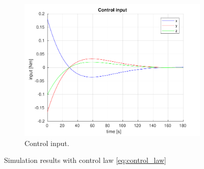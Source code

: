 \begin{figure}[ht]
\begin{subfigure}[b]{0.45\textwidth}
		\includegraphics[width=\textwidth]{1_3_control_input}
		\caption{Control input.}
		\label{fig:2c}
	\end{subfigure}
	\caption{Simulation results with control law \eqref{eq:control_law}}\label{fig:zero_control_law}
\end{figure}

